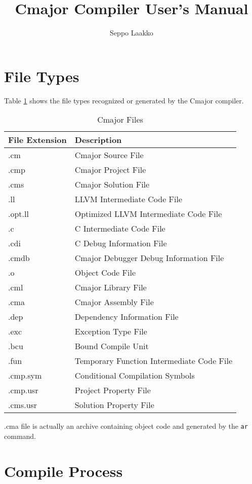 \documentclass[oneside, a4paper, 11pt]{article}
\begin{document}
\title{Cmajor Compiler User's Manual}
\author{Seppo Laakko}
\maketitle

\section{File Types}

Table \ref{tab:files} shows the file types recognized or generated by the Cmajor compiler.

\begin{table}[htb]
\caption{Cmajor Files}\label{tab:files}
\begin{tabular}{ll}
\textbf{File Extension} & \textbf{Description}\\
\hline
.cm & Cmajor Source File\\
.cmp & Cmajor Project File\\
.cms & Cmajor Solution File\\
.ll & LLVM Intermediate Code File\\
.opt.ll & Optimized LLVM Intermediate Code File\\
.c & C Intermediate Code File\\
.cdi & C Debug Information File\\
.cmdb & Cmajor Debugger Debug Information File\\
.o & Object Code File\\
.cml & Cmajor Library File\\
.cma & Cmajor Assembly File\\
.dep & Dependency Information File\\
.exc & Exception Type File\\
.bcu & Bound Compile Unit\\
.fun & Temporary Function Intermediate Code File\\
.cmp.sym & Conditional Compilation Symbols\\
.cmp.usr & Project Property File\\
.cms.usr & Solution Property File\\
\end{tabular}
\end{table}

.cma file is actually an archive containing object code and generated by the \verb|ar| command.\\

\section{Compile Process}
\end{document}
